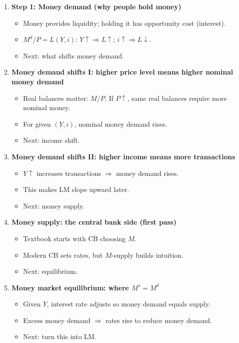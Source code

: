 \documentclass[11pt]{article}
\begin{document}
\begin{enumerate}
\item \textbf{Step 1: Money demand (why people hold money)}
\begin{itemize}
\item Money provides liquidity; holding it has opportunity cost (interest).
\item $M^d/P = L(Y,i)$: $Y\uparrow \Rightarrow L\uparrow$; $i\uparrow \Rightarrow L\downarrow$.
\item Next: what shifts money demand.
\end{itemize}

\item \textbf{Money demand shifts I: higher price level means higher nominal money demand}
\begin{itemize}
\item Real balances matter: $M/P$. If $P\uparrow$, same real balances require more nominal money.
\item For given $(Y,i)$, nominal money demand rises.
\item Next: income shift.
\end{itemize}

\item \textbf{Money demand shifts II: higher income means more transactions}
\begin{itemize}
\item $Y\uparrow$ increases transactions $\Rightarrow$ money demand rises.
\item This makes LM slope upward later.
\item Next: money supply.
\end{itemize}

\item \textbf{Money supply: the central bank side (first pass)}
\begin{itemize}
\item Textbook starts with CB choosing $M$.
\item Modern CB sets rates, but $M$-supply builds intuition.
\item Next: equilibrium.
\end{itemize}

\item \textbf{Money market equilibrium: where $M^s = M^d$}
\begin{itemize}
\item Given $Y$, interest rate adjusts so money demand equals supply.
\item Excess money demand $\Rightarrow$ rates rise to reduce money demand.
\item Next: turn this into LM.
\end{itemize}


\end{enumerate}
\end{document}
